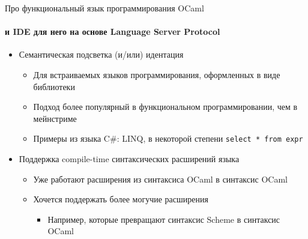 \documentclass[aspectratio=169
  , xcolor={svgnames}
  , hyperref=
      { colorlinks
      , urlcolor=DarkBlue
      }  
  , 12pt
  , russian  %
  ]{beamer}
\begin{document}
\begin{frame}[fragile]{Про функциональный язык программирования OCaml }
\framesubtitle{и IDE для него на основе Language Server Protocol}

\begin{itemize}
\item Семантическая подсветка (и/или) идентация \href{http://kakadu.github.io/fp2020/projects.html\#semantich-highlighting}{\faGithub}
\begin{itemize}
\item Для встраиваемых языков программирования, оформленных в виде библиотеки
\item Подход более популярный в функциональном программировании, чем в мейнстриме
\item Примеры из языка C\#: LINQ, в некоторой степени \texttt{select * from expr}
\end{itemize}\pause

\item Поддержка compile-time синтаксических расширений языка
\href{http://kakadu.github.io/fp2020/projects.html#ide-camlp5}{\faGithub}
\begin{itemize}
\item Уже работают расширения из синтаксиса OCaml в синтаксис OCaml
\item Хочется поддержать более могучие расширения
\begin{itemize}
\item Например, которые превращают синтаксис Scheme в синтаксис OCaml
\end{itemize}
\end{itemize}

\end{itemize}
\end{frame}
\end{document}
